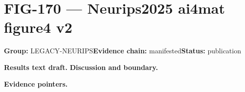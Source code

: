 \clearpage
\section{FIG-170 --- Neurips2025 ai4mat figure4 v2}
\label{figpage:fig-170}
\textbf{Group:} LEGACY-NEURIPS\quad \textbf{Evidence chain:} manifested\quad \textbf{Status:} publication

\textbf{Results text draft.} 
\textbf{Discussion and boundary.} 


\textbf{Evidence pointers.}



\vfill
